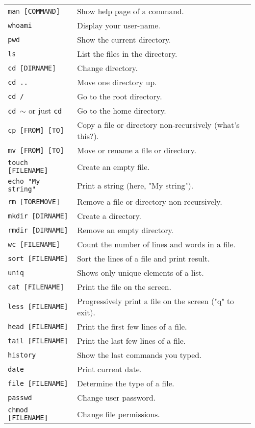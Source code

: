 \begin{tabular}{p{} p{}} 
 {\tt man [COMMAND]} & Show help page of a command.\\
 {\tt whoami} & Display your user-name.\\
 {\tt pwd} & Show the current directory.\\
 {\tt ls} & List the files in the directory.\\
 {\tt cd [DIRNAME]} & Change directory.\\ 
 {\tt cd ..} & Move one directory up. \\
 {\tt cd /} & Go to the root directory. \\
 {\tt cd $\sim$} or just {\tt cd } & Go to the home directory.\\
 {\tt cp [FROM] [TO]} & Copy a file or directory non-recursively (what's this?).\\
 {\tt mv [FROM] [TO]} & Move or rename a file or directory.\\
 {\tt touch [FILENAME]} & Create an empty file.\\
 {\tt echo "My string"} & Print a string (here, "My string").\\
 {\tt rm [TOREMOVE]} & Remove a file or directory non-recursively.\\
 {\tt mkdir [DIRNAME]} & Create a directory.\\
 {\tt rmdir [DIRNAME]} & Remove an empty directory.\\
 {\tt wc [FILENAME]} & Count the number of lines and words in a file.\\
 {\tt sort [FILENAME]} & Sort the lines of a file and print result.\\
 {\tt uniq } & Shows only unique elements of a list.\\
 {\tt cat [FILENAME]} & Print the file on the screen.\\
 {\tt less [FILENAME]} & Progressively print a file on the screen ("q" 
 to exit).\\
 {\tt head [FILENAME]} & Print the first few lines of a file.\\
 {\tt tail [FILENAME]} & Print the last few lines of a file.\\
 {\tt history} & Show the last commands you typed.\\
 {\tt date} & Print current date.\\
 {\tt file [FILENAME]} & Determine the type of a file.\\
 {\tt passwd} & Change user password.\\
 {\tt chmod [FILENAME]} & Change file permissions.
\end{tabular}
  
